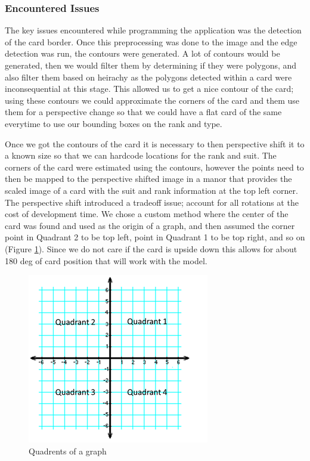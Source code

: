 \documentclass[conference]{IEEEtran}
\begin{document}
\subsubsection{Encountered Issues}
The key issues encountered while programming the application was the detection of the card border.
Once this preprocessing was done to the image and the edge detection was run, the contours were
generated. A lot of contours would be generated, then we would filter them by determining if they
were polygons, and also filter them based on heirachy as the polygons detected within a card were
inconsequential at this stage. This allowed us to get a nice contour of the card; using these
contours we could approximate the corners of the card and them use them for a perspective change so
that we could have a flat card of the same everytime to use our bounding boxes on the rank and type.

Once we got the contours of the card it is necessary to then perspective shift it to a known size so
that we can hardcode locations for the rank and suit. The corners of the card were estimated using
the contours, however the points need to then be mapped to the perspective shifted image in a manor
that provides the scaled image of a card with the suit and rank information at the top left corner.
The perspective shift introduced a tradeoff issue; account for all rotations at the cost of
development time. We chose a custom method where the center of the card was found and used as the
origin of a graph, and then assumed the corner point in Quadrant 2 to be top left, point in Quadrant
1 to be top right, and so on (Figure \ref{fig:graph}). Since we do not care if the card is upside
down this allows for about 180 deg of card position that will work with the model.

\begin{figure}[htbp]
\centerline{\includegraphics{graph-quadrants.png}}
\caption{Quadrents of a graph}
\label{fig:graph}
\end{figure}
\end{document}
